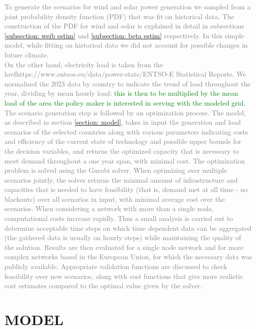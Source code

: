 \textcolor{gray}{
To generate the scenarios for wind and solar power generation we sampled from a joint probability density function (PDF) that was fit on historical data. The construction of the PDF for wind and solar is explained in detail in subsections \ref{subsection: weib estim} and \ref{subsection: beta estim} respectively. 
  In this simple model, while fitting on historical data we did not account for possible changes in future climate.\\
On the other hand, electricity load is taken from the \\href{https://www.entsoe.eu/data/power-stats/}{ENTSO-E Statistical Reports}. We normalised the 2023 data by country to indicate the trend of load throughout the year, dividing by mean hourly load: \textcolor{green}{this is then to be multiplied by the mean load of the area the policy maker is interested in serving with the modeled grid.}
The scenario generation step is followed by an optimization process. The model, as described in section \ref{section: model}, takes in input the generation and load scenarios of the selected countries along with various parameters indicating costs and efficiency of the current state of technology and possible upper bounds for the decision variables, and returns the optimized capacity that is necessary to meet demand throughout a one year span, with minimal cost. The optimization problem is solved using the Gurobi solver.
When optimizing over multiple scenarios jointly, the solver returns the minimal amount of infrastructure and capacities that is needed to have feasibility (that is, demand met at all time - no blackouts) over all scenarios in input, with minimal average cost over the scenarios.
When considering a network with more than a single node, computational costs increase rapidly. Thus a small analysis is carried out to determine acceptable time steps on which time dependent data can be aggregated (the gathered data is usually on hourly steps) while maintaining the quality of the solution. 
Results are then evaluated for a single node network and for more complex networks based in the European Union, for which the necessary data was publicly available. Appropriate validation functions are discussed to check feasibility over new scenarios, along with cost functions that give more realistic cost estimates compared to the optimal value given by the solver.
}
\section{MODEL}

